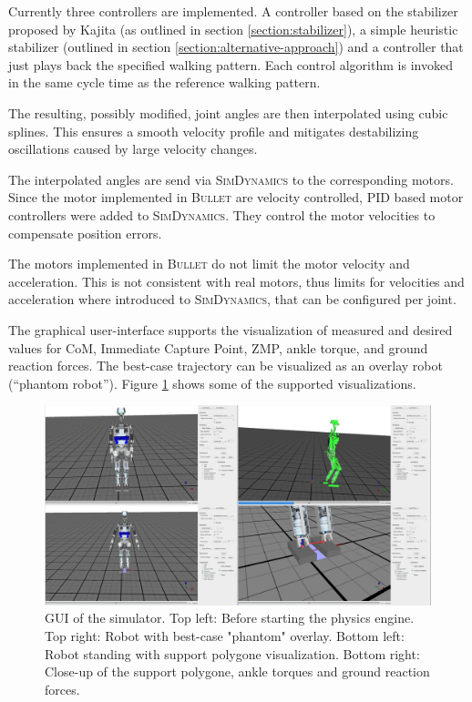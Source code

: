 \documentclass[english,ngerman]{KITreprt}
\newcommand{\name}[1]{\textsc{#1}}
\begin{document}
Currently three controllers are implemented. A controller based on the
stabilizer proposed by Kajita (as outlined in section
\ref{section:stabilizer}), a simple heuristic stabilizer (outlined in
section \ref{section:alternative-approach}) and a controller that just
plays back the specified walking pattern. Each control algorithm is
invoked in the same cycle time as the reference walking pattern.

The resulting, possibly modified, joint angles are then interpolated
using cubic splines. This ensures a smooth velocity profile and
mitigates destabilizing oscillations caused by large velocity changes.

The interpolated angles are send via \name{SimDynamics} to the
corresponding motors. Since the motor implemented in \name{Bullet} are
velocity controlled, PID based motor controllers were added to
\name{SimDynamics}. They control the motor velocities to compensate
position errors.

The motors implemented in \name{Bullet} do not limit the motor velocity
and acceleration. This is not consistent with real motors, thus limits
for velocities and acceleration where introduced to \name{SimDynamics},
that can be configured per joint.

The graphical user-interface supports the visualization of measured and
desired values for CoM, Immediate Capture Point, ZMP, ankle torque, and
ground reaction forces. The best-case trajectory can be visualized as an
overlay robot (``phantom robot''). Figure \ref{img:simulator-thumbs}
shows some of the supported visualizations.

\begin{figure}[htb]
\vspace*{-1em}
\includegraphics[width=\textwidth]{images/simulator_thumbs.png}
\caption{GUI of the simulator. Top left: Before starting the physics engine. Top right: Robot with
best-case "phantom" overlay. Bottom left: Robot standing with support polygone visualization. Bottom right:
Close-up of the support polygone, ankle torques and ground reaction forces.}
\label{img:simulator-thumbs}
\end{figure}
\end{document}
